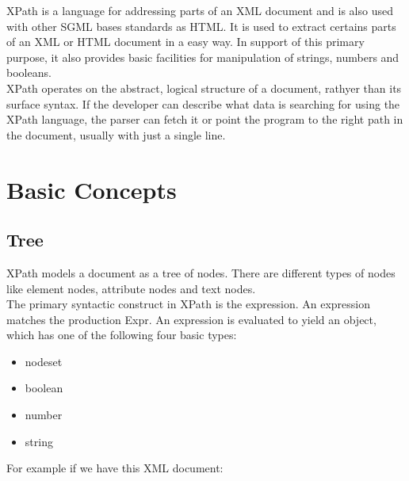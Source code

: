 XPath is a language for addressing parts of an XML document and is also used with other SGML bases standards as HTML. It is used to extract certains parts of an XML or HTML document in a easy way. In support of this primary purpose, it also provides basic facilities for manipulation of strings, numbers and booleans.\\

XPath operates on the abstract, logical structure of a document, rathyer than its surface syntax. If the developer can describe what data is searching for using the XPath language, the parser can fetch it or point the program to the right path in the document, usually with just a single line.\\

\section{Basic Concepts}

\subsection{Tree}

XPath models a document as a tree of nodes. There are different types of nodes like element nodes, attribute nodes and text nodes.\\

The primary syntactic construct in XPath is the expression. An expression matches the production Expr. An expression is evaluated to yield an object, which has one of the following four basic types:\\

\begin{itemize}
	\item nodeset
	\item boolean
	\item number
	\item string
\end{itemize}

For example if we have this XML document:

\newpage


